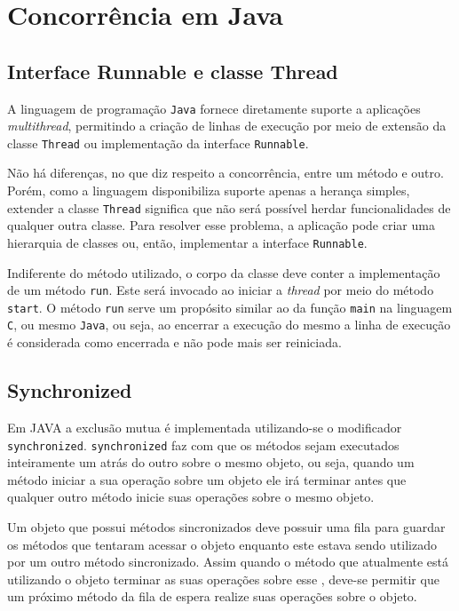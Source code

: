 \chapter{Concorrência em Java}
\label{cha:concjava}

\section{Interface Runnable e classe Thread}

A linguagem de programação \texttt{Java} fornece diretamente suporte a
aplicações \textit{multithread}, permitindo a criação de linhas de
execução por meio de extensão da classe \verb!Thread! ou implementação
da interface \verb!Runnable!.

Não há diferenças, no que diz respeito a concorrência, entre um método
e outro. Porém, como a linguagem disponibiliza suporte apenas a
herança simples, extender a classe \verb!Thread! significa que não
será possível herdar funcionalidades de qualquer outra classe. Para
resolver esse problema, a aplicação pode criar uma hierarquia de
classes ou, então, implementar a interface \verb!Runnable!.

Indiferente do método utilizado, o corpo da classe deve conter a
implementação de um método \verb!run!. Este será invocado ao iniciar a
\textit{thread} por meio do método \verb!start!. O método \verb!run!
serve um propósito similar ao da função \verb!main! na linguagem
\texttt{C}, ou mesmo \texttt{Java}, ou seja, ao encerrar a execução do
mesmo a linha de execução é considerada como encerrada e não pode mais
ser reiniciada.

\section{Synchronized}

Em JAVA a exclusão mutua é implementada utilizando-se o modificador
\texttt{synchronized}. \texttt{synchronized} faz com que os métodos sejam
executados inteiramente um atrás do outro sobre o mesmo objeto, ou seja,
quando um método iniciar a sua operação sobre um objeto ele irá terminar
antes que qualquer outro método inicie suas operações sobre o mesmo objeto.

Um objeto que possui métodos sincronizados deve possuir uma fila para
guardar os métodos que tentaram acessar o objeto enquanto este estava sendo
utilizado por um outro método sincronizado. Assim quando o método que
atualmente está utilizando o objeto terminar as suas operações sobre esse
, deve-se permitir que um próximo método da fila de espera realize suas
operações sobre o objeto. 

